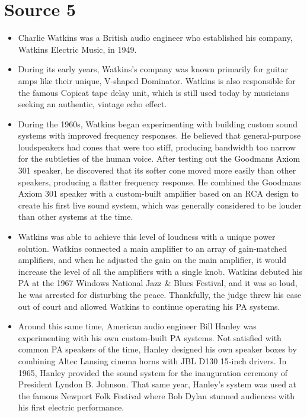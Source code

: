 \documentclass[12pt]{article}
\begin{document}
    \section{Source 5 \cite{coulesHistoryLiveSound2021a}}
        \bigskip
        \begin{itemize}
        
            \item Charlie Watkins was a British audio engineer who established his company, Watkins Electric Music, in 1949. 
            \item During its early years, Watkins's company was known primarily for guitar amps like their unique, V-shaped Dominator. Watkins is also responsible for the famous Copicat tape delay unit, which is still used today by musicians seeking an authentic, vintage echo effect.
            \item During the 1960s, Watkins began experimenting with building custom sound systems with improved frequency responses. He believed that general-purpose loudspeakers had cones that were too stiff, producing bandwidth too narrow for the subtleties of the human voice. After testing out the Goodmans Axiom 301 speaker, he discovered that its softer cone moved more easily than other speakers, producing a flatter frequency response. He combined the Goodmans Axiom 301 speaker with a custom-built amplifier based on an RCA design to create his first live sound system, which was generally considered to be louder than other systems at the time.
            \item Watkins was able to achieve this level of loudness with a unique power solution. Watkins connected a main amplifier to an array of gain-matched amplifiers, and when he adjusted the gain on the main amplifier, it would increase the level of all the amplifiers with a single knob. Watkins debuted his PA at the 1967 Windows National Jazz \& Blues Festival, and it was so loud, he was arrested for disturbing the peace. Thankfully, the judge threw his case out of court and allowed Watkins to continue operating his PA systems.
            \item Around this same time, American audio engineer Bill Hanley was experimenting with his own custom-built PA systems. Not satisfied with common PA speakers of the time, Hanley designed his own speaker boxes by combining Altec Lansing cinema horns with JBL D130 15-inch drivers. In 1965, Hanley provided the sound system for the inauguration ceremony of President Lyndon B. Johnson. That same year, Hanley's system was used at the famous Newport Folk Festival where Bob Dylan stunned audiences with his first electric performance.

\end{itemize}
\end{document}
